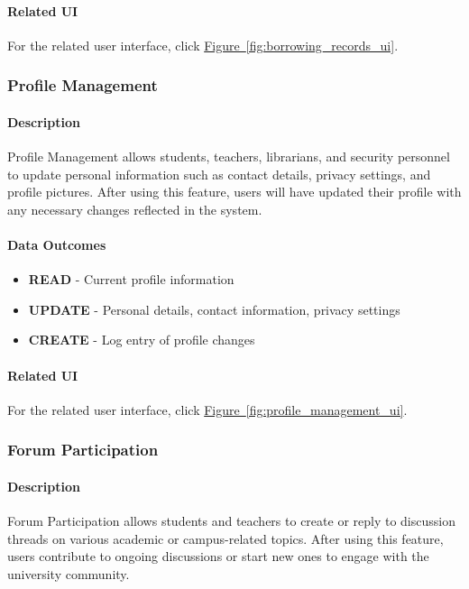\documentclass[12pt]{article}
\begin{document}
\paragraph{Related UI}
For the related user interface, click \hyperref[fig:borrowing_records_ui]{Figure~\ref*{fig:borrowing_records_ui}}.

\subsubsection{Profile Management}

\paragraph{Description}
Profile Management allows students, teachers, librarians, and security personnel to update personal information such as contact details, privacy settings, and profile pictures. After using this feature, users will have updated their profile with any necessary changes reflected in the system.

\paragraph{Data Outcomes}
\begin{itemize}
    \item \textbf{READ} - Current profile information
    \item \textbf{UPDATE} - Personal details, contact information, privacy settings
    \item \textbf{CREATE} - Log entry of profile changes
\end{itemize}

\paragraph{Related UI}
For the related user interface, click \hyperref[fig:profile_management_ui]{Figure~\ref*{fig:profile_management_ui}}.

\subsubsection{Forum Participation}

\paragraph{Description}
Forum Participation allows students and teachers to create or reply to discussion threads on various academic or campus-related topics. After using this feature, users contribute to ongoing discussions or start new ones to engage with the university community.
\end{document}
